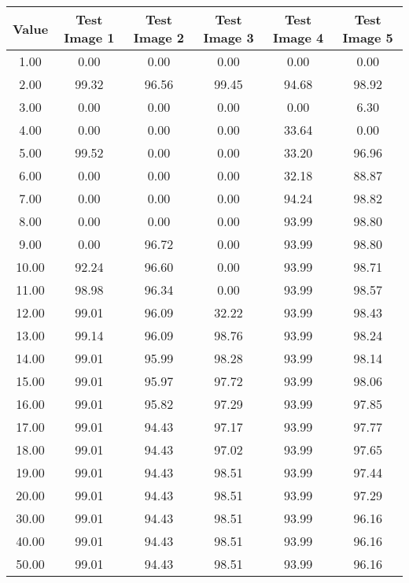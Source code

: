 \begin{tabular}{|c|c|c|c|c|c|}
\hline
\textbf{Value}&\textbf{Test Image 1}&\textbf{Test Image 2}&\textbf{Test Image 3}&\textbf{Test Image 4}&\textbf{Test Image 5}\\\hline
1.00&0.00&0.00&0.00&0.00&0.00\\\hline
2.00&99.32&96.56&99.45&94.68&98.92\\\hline
3.00&0.00&0.00&0.00&0.00&6.30\\\hline
4.00&0.00&0.00&0.00&33.64&0.00\\\hline
5.00&99.52&0.00&0.00&33.20&96.96\\\hline
6.00&0.00&0.00&0.00&32.18&88.87\\\hline
7.00&0.00&0.00&0.00&94.24&98.82\\\hline
8.00&0.00&0.00&0.00&93.99&98.80\\\hline
9.00&0.00&96.72&0.00&93.99&98.80\\\hline
10.00&92.24&96.60&0.00&93.99&98.71\\\hline
11.00&98.98&96.34&0.00&93.99&98.57\\\hline
12.00&99.01&96.09&32.22&93.99&98.43\\\hline
13.00&99.14&96.09&98.76&93.99&98.24\\\hline
14.00&99.01&95.99&98.28&93.99&98.14\\\hline
15.00&99.01&95.97&97.72&93.99&98.06\\\hline
16.00&99.01&95.82&97.29&93.99&97.85\\\hline
17.00&99.01&94.43&97.17&93.99&97.77\\\hline
18.00&99.01&94.43&97.02&93.99&97.65\\\hline
19.00&99.01&94.43&98.51&93.99&97.44\\\hline
20.00&99.01&94.43&98.51&93.99&97.29\\\hline
30.00&99.01&94.43&98.51&93.99&96.16\\\hline
40.00&99.01&94.43&98.51&93.99&96.16\\\hline
50.00&99.01&94.43&98.51&93.99&96.16\\\hline
\end{tabular}
